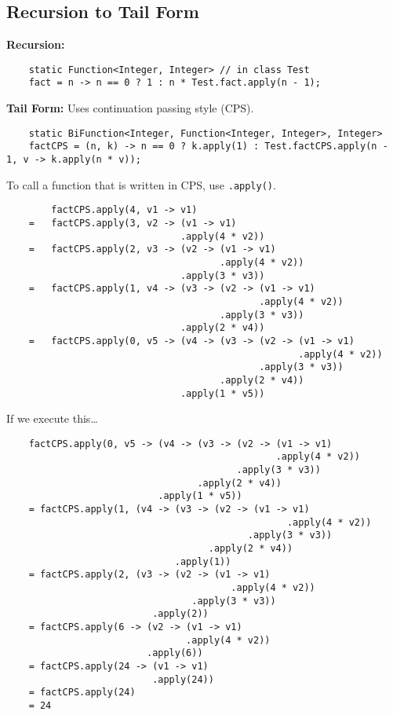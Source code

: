 \documentclass[10pt]{article}
\begin{document}
\subsection{Recursion to Tail Form}
\textbf{Recursion:}
\begin{verbatim}
    static Function<Integer, Integer> // in class Test
    fact = n -> n == 0 ? 1 : n * Test.fact.apply(n - 1);
\end{verbatim}
\textbf{Tail Form:}
Uses continuation passing style (CPS).
\begin{verbatim}
    static BiFunction<Integer, Function<Integer, Integer>, Integer>
    factCPS = (n, k) -> n == 0 ? k.apply(1) : Test.factCPS.apply(n - 1, v -> k.apply(n * v));
\end{verbatim}
To call a function that is written in CPS, use \texttt{.apply()}.
\begin{verbatim}
        factCPS.apply(4, v1 -> v1)
    =   factCPS.apply(3, v2 -> (v1 -> v1)
                               .apply(4 * v2))
    =   factCPS.apply(2, v3 -> (v2 -> (v1 -> v1)
                                      .apply(4 * v2))
                               .apply(3 * v3))
    =   factCPS.apply(1, v4 -> (v3 -> (v2 -> (v1 -> v1)
                                             .apply(4 * v2))
                                      .apply(3 * v3))
                               .apply(2 * v4))
    =   factCPS.apply(0, v5 -> (v4 -> (v3 -> (v2 -> (v1 -> v1)
                                                    .apply(4 * v2))
                                             .apply(3 * v3))
                                      .apply(2 * v4))
                               .apply(1 * v5))                         
\end{verbatim}
If we execute this\dots
\begin{verbatim}
    factCPS.apply(0, v5 -> (v4 -> (v3 -> (v2 -> (v1 -> v1)
                                                .apply(4 * v2))
                                         .apply(3 * v3))
                                  .apply(2 * v4))
                           .apply(1 * v5))  
    = factCPS.apply(1, (v4 -> (v3 -> (v2 -> (v1 -> v1)
                                                  .apply(4 * v2))
                                           .apply(3 * v3))
                                    .apply(2 * v4))
                              .apply(1))  
    = factCPS.apply(2, (v3 -> (v2 -> (v1 -> v1)
                                        .apply(4 * v2))
                                 .apply(3 * v3))
                          .apply(2))
    = factCPS.apply(6 -> (v2 -> (v1 -> v1)
                                .apply(4 * v2))
                         .apply(6))
    = factCPS.apply(24 -> (v1 -> v1)
                          .apply(24))
    = factCPS.apply(24)
    = 24                              
\end{verbatim}
\end{document}
